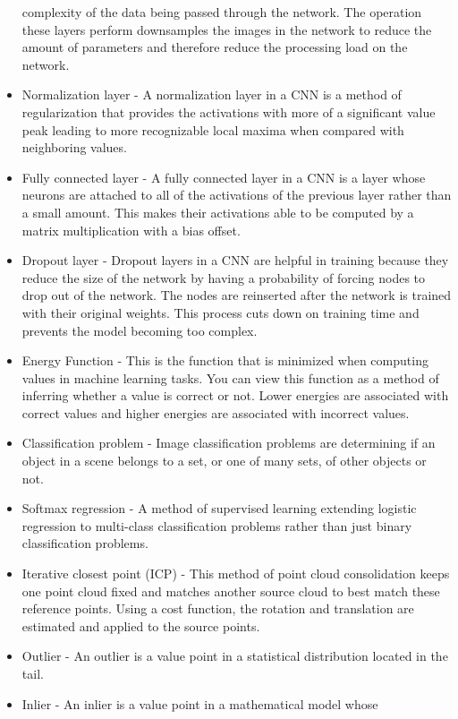 \documentclass[12pt]{article}
\begin{document}
\begin{itemize}
  complexity of the data being passed through the network. The operation
  these layers perform downsamples the images in the network to reduce
  the amount of parameters and therefore reduce the processing load on
  the network.
\item
  Normalization layer - A normalization layer in a CNN is a method of
  regularization that provides the activations with more of a
  significant value peak leading to more recognizable local maxima when
  compared with neighboring values.
\item
  Fully connected layer - A fully connected layer in a CNN is a layer
  whose neurons are attached to all of the activations of the previous
  layer rather than a small amount. This makes their activations able to
  be computed by a matrix multiplication with a bias offset.
\item
  Dropout layer - Dropout layers in a CNN are helpful in training
  because they reduce the size of the network by having a probability of
  forcing nodes to drop out of the network. The nodes are reinserted
  after the network is trained with their original weights. This process
  cuts down on training time and prevents the model becoming too
  complex.
\item
  Energy Function - This is the function that is minimized when
  computing values in machine learning tasks. You can view this function
  as a method of inferring whether a value is correct or not. Lower
  energies are associated with correct values and higher energies are
  associated with incorrect values.
\item
  Classification problem - Image classification problems are determining
  if an object in a scene belongs to a set, or one of many sets, of
  other objects or not.
\item
  Softmax regression - A method of supervised learning extending
  logistic regression to multi-class classification problems rather than
  just binary classification problems.
\item
  Iterative closest point (ICP) - This method of point cloud
  consolidation keeps one point cloud fixed and matches another source
  cloud to best match these reference points. Using a cost function, the
  rotation and translation are estimated and applied to the source
  points.
\item
  Outlier - An outlier is a value point in a statistical distribution
  located in the tail.
\item
  Inlier - An inlier is a value point in a mathematical model whose

\end{itemize}
\end{document}
